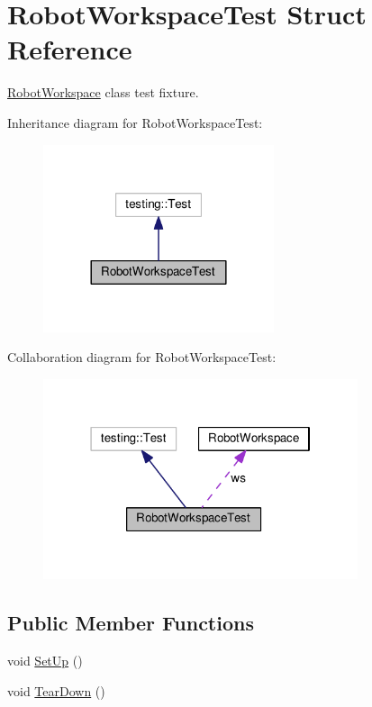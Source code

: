 \hypertarget{structRobotWorkspaceTest}{}\section{Robot\+Workspace\+Test Struct Reference}
\label{structRobotWorkspaceTest}


\hyperlink{classRobotWorkspace}{Robot\+Workspace} class test fixture.  




Inheritance diagram for Robot\+Workspace\+Test\+:
\nopagebreak
\begin{figure}[H]
\begin{center}
\leavevmode
\includegraphics[width=192pt]{structRobotWorkspaceTest__inherit__graph}
\end{center}
\end{figure}


Collaboration diagram for Robot\+Workspace\+Test\+:
\nopagebreak
\begin{figure}[H]
\begin{center}
\leavevmode
\includegraphics[width=262pt]{structRobotWorkspaceTest__coll__graph}
\end{center}
\end{figure}
\subsection*{Public Member Functions}
\begin{DoxyCompactItemize}
\item 
void \hyperlink{structRobotWorkspaceTest_a2139bb8873c63aacf5096b299a639d96}{Set\+Up} ()
\item 
void \hyperlink{structRobotWorkspaceTest_a59c52221366f68ed23bd7db4a8c2925c}{Tear\+Down} ()
\end{DoxyCompactItemize}
